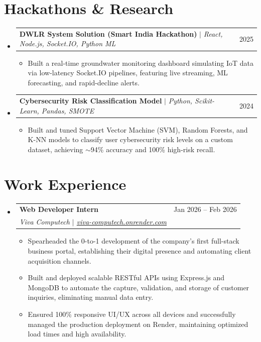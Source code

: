 \documentclass[11pt,letterpaper]{article}
\makeatletter
\newcommand{\resumeItem}[1]{\item\small{\color{MatteBlack}#1}}
\newcommand{\resumeSubheading}[3]{
  \vspace{-1pt}\item
    \begin{tabular*}{0.97\textwidth}[t]{l@{\extracolsep{\fill}}r}
      \textbf{#1} & \color{SlateGrey}#2 \\
      \textit{\small#3} \\
    \end{tabular*}\vspace{-5pt}
}
\newcommand{\resumeProjectHeading}[2]{
    \vspace{-1pt}\item
    \begin{tabular*}{0.97\textwidth}{l@{\extracolsep{\fill}}r}
      \small#1 & \color{SlateGrey}#2 \\
    \end{tabular*}\vspace{-5pt}
}
\makeatother
\begin{document}
\section{Hackathons \& Research}
    \begin{itemize}[leftmargin=0.15in, label={}, itemsep=0pt, parsep=0pt]
      \resumeProjectHeading
          {\textbf{DWLR System Solution (Smart India Hackathon)} $|$ \emph{React, Node.js, Socket.IO, Python ML}}{2025}
          \begin{itemize}[leftmargin=0.15in, label={$\bullet$}, itemsep=1pt, parsep=0pt]
            \resumeItem{Built a real-time groundwater monitoring dashboard simulating IoT data via low-latency Socket.IO pipelines, featuring live streaming, ML forecasting, and rapid-decline alerts.}
          \end{itemize}
          \vspace{3pt}
          
      \resumeProjectHeading
          {\textbf{Cybersecurity Risk Classification Model} $|$ \emph{Python, Scikit-Learn, Pandas, SMOTE}}{2024}
          \begin{itemize}[leftmargin=0.15in, label={$\bullet$}, itemsep=1pt, parsep=0pt]
            \resumeItem{Built and tuned Support Vector Machine (SVM), Random Forests, and K-NN models to classify user cybersecurity risk levels on a custom dataset, achieving $\sim$94\% accuracy and 100\% high-risk recall.}
          \end{itemize}
    \end{itemize}

\section{Work Experience}
  \begin{itemize}[leftmargin=0.15in, label={}, itemsep=0pt, parsep=0pt]
    \resumeSubheading
      {Web Developer Intern}{Jan 2026 -- Feb 2026}
      {Viva Computech $|$ \href{https://viva-computech.onrender.com}{\color{DeepBlue}viva-computech.onrender.com}}
      \begin{itemize}[leftmargin=0.15in, label={$\bullet$}, itemsep=1pt, parsep=0pt]
        \resumeItem{Spearheaded the 0-to-1 development of the company's first full-stack business portal, establishing their digital presence and automating client acquisition channels.}
        \resumeItem{Built and deployed scalable RESTful APIs using Express.js and MongoDB to automate the capture, validation, and storage of customer inquiries, eliminating manual data entry.}
        \resumeItem{Ensured 100\% responsive UI/UX across all devices and successfully managed the production deployment on Render, maintaining optimized load times and high availability.}
      \end{itemize}
  \end{itemize}
\end{document}
